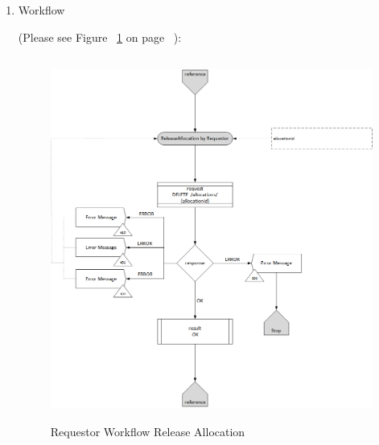 \begin{enumerate}


\item Workflow

(Please see Figure ~\ref{fig:RRA} on page ~\pageref{fig:RRA}):

\begin{figure}[htbp]
    \centering
    \includegraphics[width=12cm,height=12cm,angle=0]{./diag/Workflow/Payment/ReleaseAllocation-R-Workflow.png}
    \caption{Requestor Workflow Release Allocation  }
	\label{fig:RRA}
\end{figure}


\end{enumerate}

\newpage